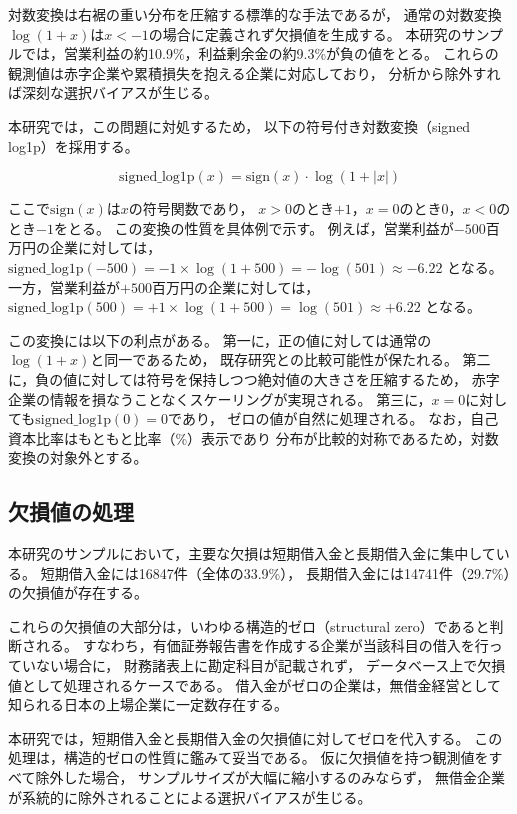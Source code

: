 対数変換は右裾の重い分布を圧縮する標準的な手法であるが，
通常の対数変換$\log(1+x)$は$x < -1$の場合に定義されず欠損値を生成する。
本研究のサンプルでは，営業利益の約10.9\%，利益剰余金の約9.3\%が負の値をとる。
これらの観測値は赤字企業や累積損失を抱える企業に対応しており，
分析から除外すれば深刻な選択バイアスが生じる。

本研究では，この問題に対処するため，
以下の符号付き対数変換（signed log1p）を採用する。

\begin{equation}
  \mathrm{signed\_log1p}(x) = \mathrm{sign}(x) \cdot \log(1 + |x|)
  \label{eq:signed-log1p}
\end{equation}

ここで$\mathrm{sign}(x)$は$x$の符号関数であり，
$x > 0$のとき$+1$，$x = 0$のとき$0$，$x < 0$のとき$-1$をとる。
この変換の性質を具体例で示す。
例えば，営業利益が$-500$百万円の企業に対しては，
$\mathrm{signed\_log1p}(-500) = -1 \times \log(1 + 500) = -\log(501) \approx -6.22$
となる。一方，営業利益が$+500$百万円の企業に対しては，
$\mathrm{signed\_log1p}(500) = +1 \times \log(1 + 500) = \log(501) \approx +6.22$
となる。

この変換には以下の利点がある。
第一に，正の値に対しては通常の$\log(1+x)$と同一であるため，
既存研究との比較可能性が保たれる。
第二に，負の値に対しては符号を保持しつつ絶対値の大きさを圧縮するため，
赤字企業の情報を損なうことなくスケーリングが実現される。
第三に，$x = 0$に対しても$\mathrm{signed\_log1p}(0) = 0$であり，
ゼロの値が自然に処理される。
なお，自己資本比率はもともと比率（\%）表示であり
分布が比較的対称であるため，対数変換の対象外とする。

\subsection{欠損値の処理}
\label{subsec:missing}

本研究のサンプルにおいて，主要な欠損は短期借入金と長期借入金に集中している。
短期借入金には\num{16847}件（全体の33.9\%），
長期借入金には\num{14741}件（29.7\%）の欠損値が存在する。

これらの欠損値の大部分は，いわゆる構造的ゼロ（structural zero）であると判断される。
すなわち，有価証券報告書を作成する企業が当該科目の借入を行っていない場合に，
財務諸表上に勘定科目が記載されず，
データベース上で欠損値として処理されるケースである。
借入金がゼロの企業は，無借金経営として知られる日本の上場企業に一定数存在する。

本研究では，短期借入金と長期借入金の欠損値に対してゼロを代入する。
この処理は，構造的ゼロの性質に鑑みて妥当である。
仮に欠損値を持つ観測値をすべて除外した場合，
サンプルサイズが大幅に縮小するのみならず，
無借金企業が系統的に除外されることによる選択バイアスが生じる。

